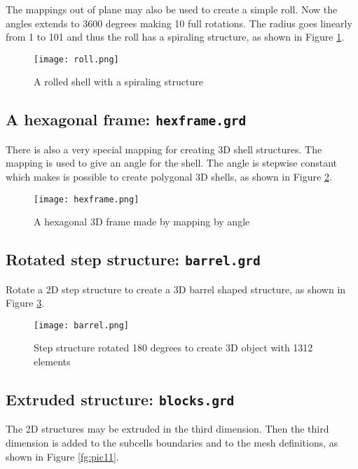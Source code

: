 The mappings out of plane may also be used to create a simple roll.
Now the angles extends to 3600 degrees making 10
full rotations. The radius goes linearly from 1 to 101 and thus the
roll has a spiraling structure, as shown in Figure \ref{fg:pic8}.



\begin{figure}[H]
\centering
\texttt{[image: roll.png]}
\caption{A rolled shell with a spiraling structure}
\label{fg:pic8}
\end{figure}


\subsection*{A hexagonal frame: \texttt{hexframe.grd}}

There is also a very special mapping for creating 
3D shell structures. The mapping is used to give an
angle for the shell. The angle is stepwise constant which makes
is possible to create polygonal 3D shells, as shown in Figure \ref{fg:pic9}.  



\begin{figure}[H]
\centering
\texttt{[image: hexframe.png]}
\caption{A hexagonal 3D frame made by mapping by angle}
\label{fg:pic9}
\end{figure}



\subsection*{Rotated step structure: \texttt{barrel.grd}}

Rotate a 2D step structure to create a 3D barrel shaped
structure, as shown in Figure \ref{fg:pic10}.



\begin{figure}[H]
\centering
\texttt{[image: barrel.png]}
\caption{Step structure rotated 180 degrees to create
      3D object with 1312 elements}
\label{fg:pic10}
\end{figure}


\subsection*{Extruded structure: \texttt{blocks.grd}}
The 2D structures may be extruded in the third dimension. 
Then the third dimension is added to the subcells
boundaries and to the mesh definitions, as shown in Figure \ref{fg:pic11}.

